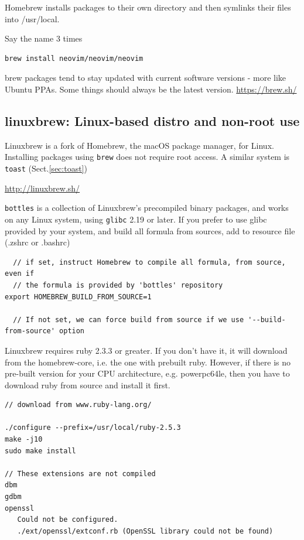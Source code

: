 Homebrew installs packages to their own directory and then symlinks their files
into /usr/local. 

Say the name 3 times
\begin{verbatim}
brew install neovim/neovim/neovim
\end{verbatim}

brew packages tend to stay updated with current software versions - more like
Ubuntu PPAs. Some things should always be the latest version. 
\url{https://brew.sh/}

\subsection{linuxbrew: Linux-based distro and non-root use}
\label{sec:linuxbrew}


Linuxbrew is a fork of Homebrew, the macOS package manager, for Linux.
Installing packages using \verb!brew! does not require root access. A similar
system is \verb!toast! (Sect.\ref{sec:toast})

\url{http://linuxbrew.sh/}

\verb!bottles! is a collection of Linuxbrew's precompiled binary packages, and works on 
any Linux system, using \verb!glibc! 2.19 or later. If you prefer to use glibc provided by your system, and
build all formula from sources, add to resource file (.zshrc or .bashrc)
\begin{verbatim}
  // if set, instruct Homebrew to compile all formula, from source, even if
  // the formula is provided by 'bottles' repository
export HOMEBREW_BUILD_FROM_SOURCE=1

  // If not set, we can force build from source if we use '--build-from-source' option
\end{verbatim}


Linuxbrew requires ruby 2.3.3 or greater. If you don't have it, it will download from the homebrew-core, i.e. the
one with prebuilt ruby. However, if there is no pre-built version for your CPU architecture, e.g. powerpc64le, then
you have to download ruby from source and install it first.

\label{sec:ruby-install}
\begin{verbatim}
// download from www.ruby-lang.org/

./configure --prefix=/usr/local/ruby-2.5.3
make -j10
sudo make install

// These extensions are not compiled
dbm
gdbm
openssl
   Could not be configured.
   ./ext/openssl/extconf.rb (OpenSSL library could not be found)
\end{verbatim}

